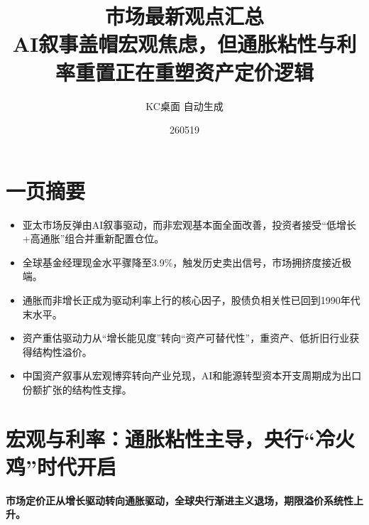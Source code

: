 \documentclass[11pt]{ctexart}
\title{\textbf{市场最新观点汇总}\\[0.4em]{\large AI叙事盖帽宏观焦虑，但通胀粘性与利率重置正在重塑资产定价逻辑}}
\author{KC桌面 自动生成}
\date{260519}
\begin{document}
\maketitle
\section*{一页摘要}
\begin{itemize}
  \item 亚太市场反弹由AI叙事驱动，而非宏观基本面全面改善，投资者接受“低增长+高通胀”组合并重新配置仓位。
  \item 全球基金经理现金水平骤降至3.9\%，触发历史卖出信号，市场拥挤度接近极端。
  \item 通胀而非增长正成为驱动利率上行的核心因子，股债负相关性已回到1990年代末水平。
  \item 资产重估驱动力从“增长能见度”转向“资产可替代性”，重资产、低折旧行业获得结构性溢价。
  \item 中国资产叙事从宏观博弈转向产业兑现，AI和能源转型资本开支周期成为出口份额扩张的结构性支撑。
\end{itemize}
\section{宏观与利率：通胀粘性主导，央行“冷火鸡”时代开启}
\textbf{市场定价正从增长驱动转向通胀驱动，全球央行渐进主义退场，期限溢价系统性上升。}
\end{document}
